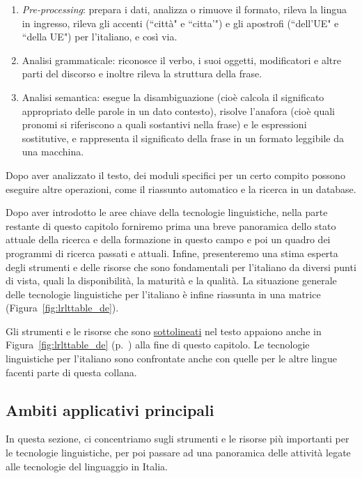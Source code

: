 \documentclass[]{../../metanetpaper}
\begin{document}
\begin{multicols}{2}
\begin{enumerate}
\item \emph{Pre-processing}: prepara i dati, analizza o rimuove il formato, rileva la lingua in ingresso, rileva gli accenti (“citt\`{a}" e “citta'") e gli apostrofi (“dell'UE" e “della UE") per l'italiano, e cos\`{i} via.
\item Analisi grammaticale: riconosce il verbo, i suoi oggetti, modificatori e altre parti del discorso e inoltre rileva la struttura della frase.
\item Analisi semantica: esegue la disambiguazione (cio\`{e} calcola il significato appropriato delle parole in un dato contesto), risolve l'anafora (cio\`{e} quali pronomi si riferiscono a quali sostantivi nella frase) e le espressioni sostitutive, e rappresenta il significato della frase in un formato leggibile da una macchina.
\end{enumerate}

Dopo aver analizzato il testo, dei moduli specifici per un certo compito
possono eseguire altre operazioni, come il riassunto automatico e la ricerca
in un database.

Dopo aver introdotto le aree chiave della tecnologie linguistiche, 
nella parte restante di questo capitolo forniremo
prima una breve panoramica dello stato attuale della ricerca e della
formazione in questo campo e poi un quadro dei programmi di ricerca
passati e attuali. Infine, presenteremo una stima esperta degli
strumenti e delle risorse che sono fondamentali per l'italiano da diversi
punti di vista, quali la disponibilit\`{a}, la maturit\`{a} e la qualit\`{a}. 
La situazione generale delle tecnologie linguistiche per l'italiano \`{e} 
infine riassunta in una matrice (Figura~\ref{fig:lrlttable_de}).

Gli strumenti e le risorse che sono \underline{sottolineati} nel testo appaiono
anche in  Figura~\ref{fig:lrlttable_de} (p.~\pageref{fig:lrlttable_de}) 
alla fine di questo capitolo. Le tecnologie linguistiche per l'italiano 
sono confrontate anche con quelle per le altre lingue facenti parte di questa 
collana.


\subsection{Ambiti applicativi principali} 

In questa sezione, ci concentriamo sugli strumenti e le risorse pi\`{u}
importanti per le tecnologie linguistiche, per poi passare ad una panoramica
delle attivit\`{a} legate alle tecnologie del linguaggio in Italia. 





\end{multicols}
\end{document}
